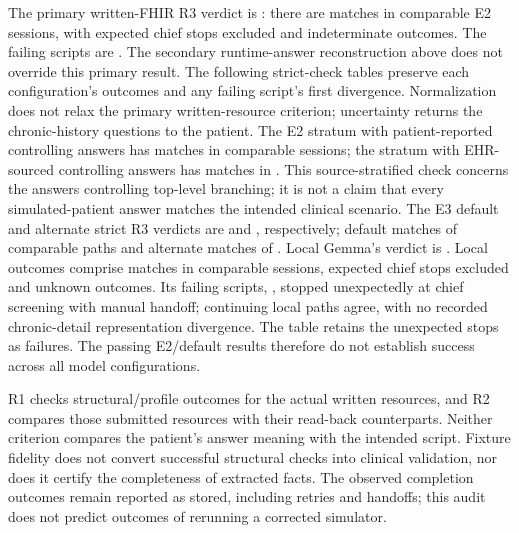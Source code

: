 The primary written-FHIR R3 verdict is \RThreeVerdict{}: there are
\ETwoWrittenPathAgree{} matches in \ETwoWrittenPathCompared{} comparable E2
sessions, with \ETwoWrittenPathExcluded{} expected chief stops excluded and
\ETwoWrittenPathUnknown{} indeterminate outcomes. The failing scripts are
\ETwoWrittenPathFailingScripts{}. The secondary runtime-answer reconstruction
above does not override this primary result. The following strict-check tables
preserve each configuration's outcomes and any failing script's first divergence.
Normalization does not relax the primary written-resource criterion; uncertainty
returns the chronic-history questions to the patient. The E2 stratum with patient-reported controlling answers has
\ETwoWrittenPathPatientControllerAgree{} matches in
\ETwoWrittenPathPatientControllerCompared{} comparable sessions; the stratum
with EHR-sourced controlling answers has \ETwoWrittenPathEhrControllerAgree{}
matches in \ETwoWrittenPathEhrControllerCompared{}. This source-stratified check
concerns the answers controlling top-level branching; it is not a claim that
every simulated-patient answer matches the intended clinical scenario.
{\small}
The E3 default and alternate strict R3 verdicts are
\EThreeDefaultRThreeVerdict{} and \EThreeAlternateRThreeVerdict{}, respectively;
default matches \EThreeDefaultWrittenPathAgree{} of
\EThreeDefaultWrittenPathCompared{} comparable paths and alternate matches
\EThreeAltWrittenPathAgree{} of \EThreeAltWrittenPathCompared{}. Local Gemma's
verdict is \EThreeLocalRThreeVerdict{}. Local outcomes comprise
\EThreeGemmaWrittenPathAgree{} matches in \EThreeGemmaWrittenPathCompared{}
comparable sessions, \EThreeGemmaWrittenPathExcluded{} expected chief stops
excluded and \EThreeGemmaWrittenPathUnknown{} unknown outcomes. Its failing
scripts, \EThreeGemmaWrittenPathFailingScripts{}, stopped unexpectedly at chief
screening with manual handoff; continuing local paths agree, with no recorded
chronic-detail representation divergence. The table retains the unexpected stops
as failures. The passing E2/default results therefore do not establish success across
all model configurations.


R1 checks structural/profile outcomes for the actual written resources, and R2
compares those submitted resources with their read-back counterparts. Neither
criterion compares the patient's answer meaning with the intended script.
Fixture fidelity does not convert successful structural checks into clinical
validation, nor does it certify the completeness of extracted facts. The observed
completion outcomes remain reported as stored, including retries and handoffs;
this audit does not predict outcomes of rerunning a corrected simulator.

